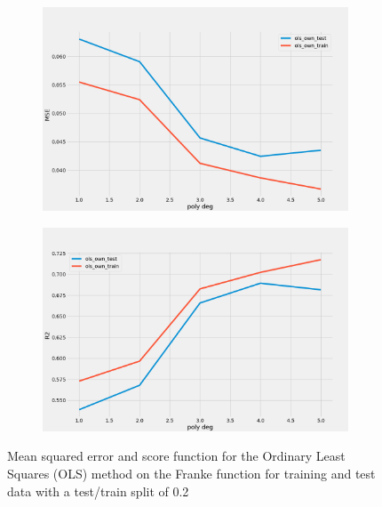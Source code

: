 \begin{figure}
     \centering
     \begin{subfigure}[b]{0.5\textwidth}
         \centering
         \includegraphics[width=\textwidth]{Figures/b_mse.png}
     \end{subfigure}%
     \hfill
     \begin{subfigure}[b]{0.5\textwidth}
         \centering
         \includegraphics[width=\textwidth]{Figures/b_r2.png}
     \end{subfigure}
        \caption{Mean squared error and score function for the Ordinary Least
        Squares (OLS) method on the Franke function for training and test data
    with a test/train split of 0.2}
        \label{fig:mse_and_score_franke}
\end{figure}

